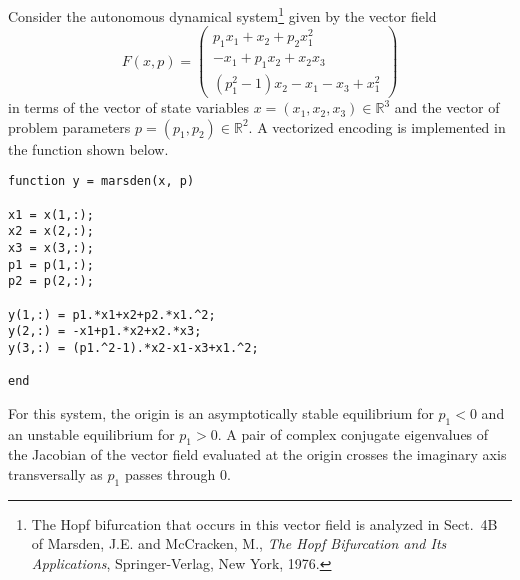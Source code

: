 Consider the autonomous dynamical system\footnote{The Hopf bifurcation that occurs in this vector field is analyzed in Sect.~4B of Marsden, J.E. and McCracken, M., \emph{The Hopf Bifurcation and Its Applications}, Springer-Verlag, New York, 1976.} given by the vector field
\begin{equation}
F(x,p)=\left(\begin{array}{c}p_1x_1+x_2+p_2x_1^2\\ -x_1+p_1x_2+x_2x_3\\ (p_1^2-1)x_2-x_1-x_3+x_1^2\end{array}\right)
\end{equation}
in terms of the vector of state variables $x=(x_1,x_2,x_3)\in\mathbb{R}^3$ and the vector of problem parameters $p=(p_1,p_2)\in\mathbb{R}^2$. A vectorized encoding is implemented in the function  shown below.
\begin{lstlisting}[language=coco-highlight]
function y = marsden(x, p)

x1 = x(1,:);
x2 = x(2,:);
x3 = x(3,:);
p1 = p(1,:);
p2 = p(2,:);

y(1,:) = p1.*x1+x2+p2.*x1.^2;
y(2,:) = -x1+p1.*x2+x2.*x3;
y(3,:) = (p1.^2-1).*x2-x1-x3+x1.^2;

end
\end{lstlisting}
For this system, the origin is an asymptotically stable equilibrium for $p_1<0$ and an unstable equilibrium for $p_1>0$. A pair of complex conjugate eigenvalues of the Jacobian of the vector field evaluated at the origin crosses the imaginary axis transversally as $p_1$ passes through $0$.

